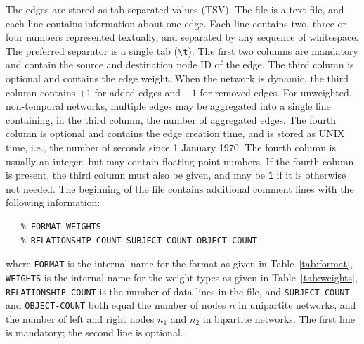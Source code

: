 \documentclass{article}
\begin{document}
The edges are stored as tab-separated values (TSV).  The file is a text
file, and each line contains information about one edge.  Each line
contains two, three or four numbers represented textually, and separated
by any sequence of whitespace.  The preferred separator is a single tab (\texttt{\textbackslash{t}}).
The first two columns are mandatory and contain the source and
destination node ID of the edge.  The third column is optional and
contains the edge weight.  When the network is dynamic, the third column
contains $+1$ for added edges and $-1$ for removed edges.  For
unweighted, non-temporal networks, multiple edges may be aggregated into
a single line containing, in the third column, the number of aggregated
edges.  The fourth column is optional and contains the edge creation
time, and is stored as UNIX time, i.e., the number of seconds since 1
January 1970.  The fourth column is usually an integer, but may contain
floating point numbers.  If the fourth column is present, the third
column must also be given, and may be \texttt{1} if it is otherwise not
needed.  The beginning of the file contains  
additional comment lines with the following information:
\begin{verbatim}
   % FORMAT WEIGHTS 
   % RELATIONSHIP-COUNT SUBJECT-COUNT OBJECT-COUNT
\end{verbatim}
where \texttt{FORMAT} is the internal name for the format as given
in Table~\ref{tab:format}, \texttt{WEIGHTS} is the internal name for
the weight types as given in Table~\ref{tab:weights},
\texttt{RELATIONSHIP-COUNT} is the number of data lines in the file,
and \texttt{SUBJECT-COUNT} and \texttt{OBJECT-COUNT} both equal the
number of nodes $n$ in unipartite networks, and the number of left
and right nodes $n_1$ and $n_2$ in bipartite networks.  The first
line is mandatory; the second line is optional.
\end{document}
